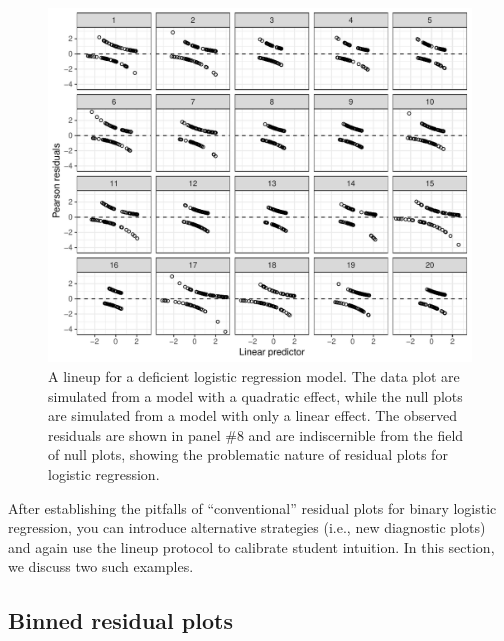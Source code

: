 \documentclass[12pt]{article}
\begin{document}
\begin{figure}
\centering
\includegraphics{figs/logistic_residuals_bad.pdf}
\caption{\label{fig:logisticissue} A lineup for a deficient logistic
regression model. The data plot are simulated from a model with a
quadratic effect, while the null plots are simulated from a model with
only a linear effect. The observed residuals are shown in panel \#8 and
are indiscernible from the field of null plots, showing the problematic
nature of residual plots for logistic regression.}
\end{figure}

After establishing the pitfalls of ``conventional'' residual plots for
binary logistic regression, you can introduce alternative strategies
(i.e., new diagnostic plots) and again use the lineup protocol to
calibrate student intuition. In this section, we discuss two such
examples.

\clearpage

\hypertarget{binned-residual-plots}{%
\subsection{Binned residual plots}\label{binned-residual-plots}}
\end{document}
